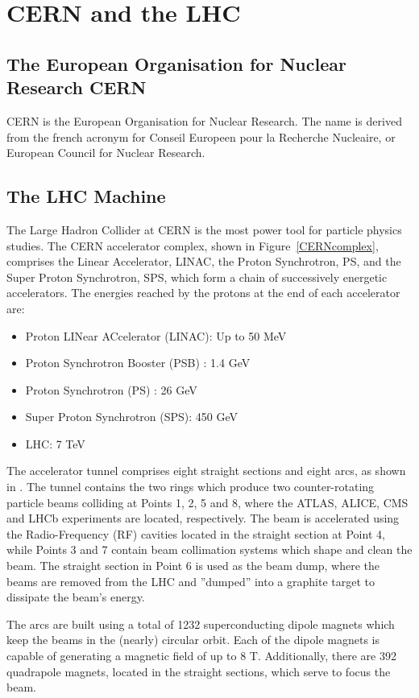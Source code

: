 \section{CERN and the LHC}
\subsection{The European Organisation for Nuclear Research CERN}
CERN is the European Organisation for Nuclear Research. The name is derived from the french
acronym for Conseil Europeen pour la Recherche Nucleaire, or European Council for Nuclear
Research.

\subsection{The LHC Machine}
The Large Hadron Collider \cite{LHC} at CERN is the most power tool for particle physics studies. 
The CERN accelerator complex, shown in Figure~\ref{CERNcomplex}, comprises the Linear
Accelerator, LINAC, the Proton Synchrotron, PS, and the Super Proton Synchrotron,
	SPS, which form a chain of successively energetic accelerators. The energies reached by the protons at the end of each accelerator are:
\begin{itemize}
	\item	Proton LINear ACcelerator (LINAC): Up to 50 MeV
	\item Proton Synchrotron Booster (PSB) : 1.4 GeV
	\item Proton Synchrotron (PS) : 26 GeV
 	\item Super Proton Synchrotron (SPS): 450 GeV
	\item LHC: 7 TeV
\end{itemize}
The accelerator tunnel comprises eight straight sections and eight arcs, as shown in .
The tunnel contains the two rings which produce two counter-rotating particle beams colliding 
at Points 1, 2, 5 and 8, where the ATLAS, ALICE, CMS and LHCb experiments are located, respectively. 
The beam is accelerated using the Radio-Frequency (RF) cavities located in the straight section at Point 4, while Points 3 and 7 contain beam
collimation systems which shape and clean the beam. The straight section in Point 6 is used as the beam dump, where the beams are removed from 
the LHC and ”dumped” into a graphite target to dissipate the beam’s energy.


The arcs are built using a total of 1232 superconducting dipole magnets which keep the beams
in the (nearly) circular orbit. Each of the dipole magnets is capable of generating a magnetic field
of up to 8 T. Additionally, there are 392 quadrapole magnets, located in the straight sections, which
serve to focus the beam.

